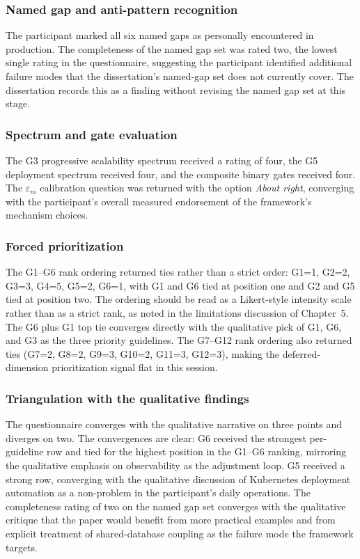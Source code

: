 \subsubsection*{Named gap and anti-pattern recognition}

The participant marked all six named gaps as personally encountered in production. The completeness of the named gap set was rated two, the lowest single rating in the questionnaire, suggesting the participant identified additional failure modes that the dissertation's named-gap set does not currently cover. The dissertation records this as a finding without revising the named gap set at this stage.

\subsubsection*{Spectrum and gate evaluation}

The G3 progressive scalability spectrum received a rating of four, the G5 deployment spectrum received four, and the composite binary gates received four. The $\varepsilon_m$ calibration question was returned with the option \emph{About right}, converging with the participant's overall measured endorsement of the framework's mechanism choices.

\subsubsection*{Forced prioritization}

The G1--G6 rank ordering returned ties rather than a strict order: G1=1, G2=2, G3=3, G4=5, G5=2, G6=1, with G1 and G6 tied at position one and G2 and G5 tied at position two. The ordering should be read as a Likert-style intensity scale rather than as a strict rank, as noted in the limitations discussion of Chapter~5. The G6 plus G1 top tie converges directly with the qualitative pick of G1, G6, and G3 as the three priority guidelines. The G7--G12 rank ordering also returned ties (G7=2, G8=2, G9=3, G10=2, G11=3, G12=3), making the deferred-dimension prioritization signal flat in this session.

\subsubsection*{Triangulation with the qualitative findings}

The questionnaire converges with the qualitative narrative on three points and diverges on two. The convergences are clear: G6 received the strongest per-guideline row and tied for the highest position in the G1--G6 ranking, mirroring the qualitative emphasis on observability as the adjustment loop. G5 received a strong row, converging with the qualitative discussion of Kubernetes deployment automation as a non-problem in the participant's daily operations. The completeness rating of two on the named gap set converges with the qualitative critique that the paper would benefit from more practical examples and from explicit treatment of shared-database coupling as the failure mode the framework targets.

